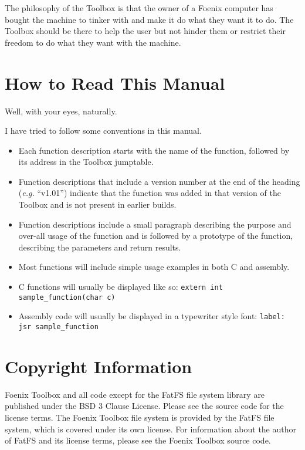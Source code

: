 The philosophy of the Toolbox is that the owner of a Foenix computer has bought the machine to tinker with and make it do what they want it to do. The Toolbox should be there to help the user but not hinder them or restrict their freedom to do what they want with the machine.

\section*{How to Read This Manual}
Well, with your eyes, naturally.

I have tried to follow some conventions in this manual.

\begin{itemize}
	\item Each function description starts with the name of the function, followed by its address in the Toolbox jumptable.
	\item Function descriptions that include a version number at the end of the heading ({\it e.g.} ``v1.01'') indicate that the function was added in that version of the Toolbox and is not present in earlier builds.
	\item Function descriptions include a small paragraph describing the purpose and over-all usage of the function and is followed by a prototype of the function, describing the parameters and return results.
	\item Most functions will include simple usage examples in both C and assembly.
	\item C functions will usually be displayed like so: \lstinline|extern int sample_function(char c)|
	\item Assembly code will usually be displayed in a typewriter style font: \verb+label: jsr sample_function+
\end{itemize}

\section*{Copyright Information}
Foenix Toolbox and all code except for the FatFS file system library are published under the BSD 3 Clause License. Please see the source code for the license terms. The Foenix Toolbox file system is provided by the FatFS file system, which is covered under its own license. For information about the author of FatFS and its license terms, please see the Foenix Toolbox source code.